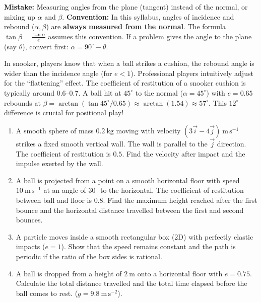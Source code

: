 \documentclass[11pt]{article}
\begin{document}
\begin{attention}
\textbf{Mistake:} Measuring angles from the plane (tangent) instead of the normal, or mixing up $\alpha$ and $\beta$.
\textbf{Convention:} In this syllabus, angles of incidence and rebound ($\alpha, \beta$) are \textbf{always measured from the normal}. The formula $\tan\beta = \frac{\tan\alpha}{e}$ assumes this convention. If a problem gives the angle to the plane (say $\theta$), convert first: $\alpha = 90^\circ - \theta$.
\end{attention}

\begin{savaistu}
In snooker, players know that when a ball strikes a cushion, the rebound angle is wider than the incidence angle (for $e<1$). Professional players intuitively adjust for the ``flattening'' effect. The coefficient of restitution of a snooker cushion is typically around $0.6$--$0.7$. A ball hit at $45^\circ$ to the normal ($\alpha=45^\circ$) with $e=0.65$ rebounds at $\beta = \arctan(\tan45^\circ/0.65) \approx \arctan(1.54) \approx 57^\circ$. This $12^\circ$ difference is crucial for positional play!
\end{savaistu}

\begin{exercice}[Exercise 12.3]
\begin{enumerate}
    \item A smooth sphere of mass $0.2\ \mathrm{kg}$ moving with velocity $(3\vec{i} - 4\vec{j})\ \mathrm{m\,s^{-1}}$ strikes a fixed smooth vertical wall. The wall is parallel to the $\vec{j}$ direction. The coefficient of restitution is $0.5$. Find the velocity after impact and the impulse exerted by the wall.
    \item A ball is projected from a point on a smooth horizontal floor with speed $10\ \mathrm{m\,s^{-1}}$ at an angle of $30^\circ$ to the horizontal. The coefficient of restitution between ball and floor is $0.8$. Find the maximum height reached after the first bounce and the horizontal distance travelled between the first and second bounces.
    \item A particle moves inside a smooth rectangular box (2D) with perfectly elastic impacts ($e=1$). Show that the speed remains constant and the path is periodic if the ratio of the box sides is rational.
    \item A ball is dropped from a height of $2\ \mathrm{m}$ onto a horizontal floor with $e=0.75$. Calculate the total distance travelled and the total time elapsed before the ball comes to rest. ($g=9.8\ \mathrm{m\,s^{-2}}$).
\end{enumerate}
\end{exercice}
\end{document}
